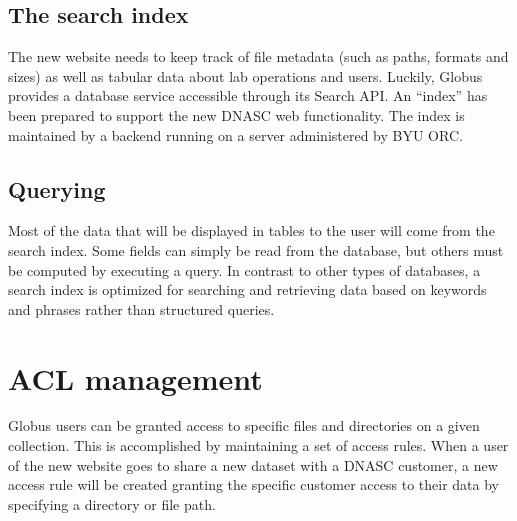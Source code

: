 \subsection{The search index}
The new website needs to keep track of file metadata (such as paths, formats and sizes) as well as tabular data about lab operations and users. Luckily, Globus provides a database service accessible through its Search API. An “index” has been prepared to support the new DNASC web functionality. The index is maintained by a backend running on a server administered by BYU ORC.

\subsection{Querying}
Most of the data that will be displayed in tables to the user will come from the search index. Some fields can simply be read from the database, but others must be computed by executing a query. In contrast to other types of databases, a search index is optimized for searching and retrieving data based on keywords and phrases rather than structured queries.

\section{ACL management}
Globus users can be granted access to specific files and directories on a given collection. This is accomplished by maintaining a set of access rules. When a user of the new website goes to share a new dataset with a DNASC customer, a new access rule will be created granting the specific customer access to their data by specifying a directory or file path.
